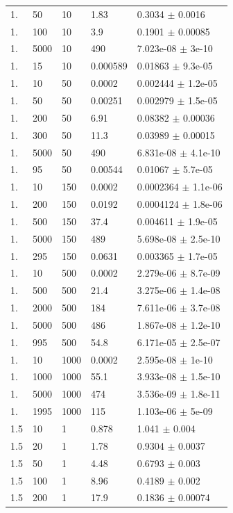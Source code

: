 \begin{longtable}{lllll}
	1. & 50 & 10 & 1.83 & 0.3034 $\pm$ 0.0016 \\
	1. & 100 & 10 & 3.9 & 0.1901 $\pm$ 0.00085 \\
	1. & 5000 & 10 & 490 & 7.023e-08 $\pm$ 3e-10 \\
	1. & 15 & 10 & 0.000589 & 0.01863 $\pm$ 9.3e-05 \\
	1. & 10 & 50 & 0.0002 & 0.002444 $\pm$ 1.2e-05 \\
	1. & 50 & 50 & 0.00251 & 0.002979 $\pm$ 1.5e-05 \\
	1. & 200 & 50 & 6.91 & 0.08382 $\pm$ 0.00036 \\
	1. & 300 & 50 & 11.3 & 0.03989 $\pm$ 0.00015 \\
	1. & 5000 & 50 & 490 & 6.831e-08 $\pm$ 4.1e-10 \\
	1. & 95 & 50 & 0.00544 & 0.01067 $\pm$ 5.7e-05 \\
	1. & 10 & 150 & 0.0002 & 0.0002364 $\pm$ 1.1e-06 \\
	1. & 200 & 150 & 0.0192 & 0.0004124 $\pm$ 1.8e-06 \\
	1. & 500 & 150 & 37.4 & 0.004611 $\pm$ 1.9e-05 \\
	1. & 5000 & 150 & 489 & 5.698e-08 $\pm$ 2.5e-10 \\
	1. & 295 & 150 & 0.0631 & 0.003365 $\pm$ 1.7e-05 \\
	1. & 10 & 500 & 0.0002 & 2.279e-06 $\pm$ 8.7e-09 \\
	1. & 500 & 500 & 21.4 & 3.275e-06 $\pm$ 1.4e-08 \\
	1. & 2000 & 500 & 184 & 7.611e-06 $\pm$ 3.7e-08 \\
	1. & 5000 & 500 & 486 & 1.867e-08 $\pm$ 1.2e-10 \\
	1. & 995 & 500 & 54.8 & 6.171e-05 $\pm$ 2.5e-07 \\
	1. & 10 & 1000 & 0.0002 & 2.595e-08 $\pm$ 1e-10 \\
	1. & 1000 & 1000 & 55.1 & 3.933e-08 $\pm$ 1.5e-10 \\
	1. & 5000 & 1000 & 474 & 3.536e-09 $\pm$ 1.8e-11 \\
	1. & 1995 & 1000 & 115 & 1.103e-06 $\pm$ 5e-09 \\
	1.5 & 10 & 1 & 0.878 & 1.041 $\pm$ 0.004 \\
	1.5 & 20 & 1 & 1.78 & 0.9304 $\pm$ 0.0037 \\
	1.5 & 50 & 1 & 4.48 & 0.6793 $\pm$ 0.003 \\
	1.5 & 100 & 1 & 8.96 & 0.4189 $\pm$ 0.002 \\
	1.5 & 200 & 1 & 17.9 & 0.1836 $\pm$ 0.00074 \\

\end{longtable}
